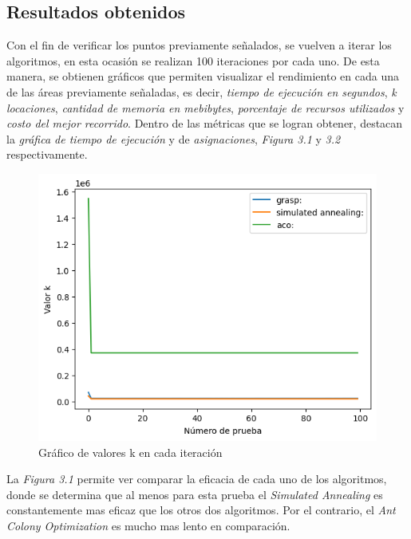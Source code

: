             \subsection{Resultados obtenidos}
                Con el fin de verificar los puntos previamente señalados, se vuelven a iterar los algoritmos, en esta ocasión se realizan 100 iteraciones por cada uno. De esta manera, se obtienen gráficos que permiten visualizar el rendimiento en cada una de las áreas previamente señaladas, es decir, \textit{tiempo de ejecución en segundos}, \textit{k locaciones}, \textit{cantidad de memoria en mebibytes}, \textit{porcentaje de recursos utilizados} y \textit{costo del mejor recorrido}.
                \newline
                \newline
                Dentro de las métricas que se logran obtener, destacan la \textit{gráfica de tiempo de ejecución} y de \textit{asignaciones}, \textit{Figura 3.1} y \textit{3.2} respectivamente.
                \newline
                \begin{figure}[ht]
                    \centering
                        \includegraphics[scale=0.8]{imgs/Grafico_k.png}
                        \caption{Gráfico de valores k en cada iteración}
                        \label{Ilustracion 2}
                \end{figure}                
                \newline
                La \textit{Figura 3.1} permite ver comparar la eficacia de cada uno de los algoritmos, donde se determina que al menos para esta prueba el \textit{Simulated Annealing} es constantemente mas eficaz que los otros dos algoritmos. Por el contrario, el \textit{Ant Colony Optimization} es mucho mas lento en comparación.
